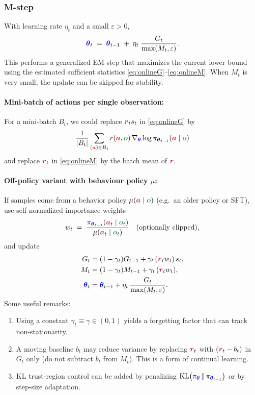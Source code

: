 \documentclass{article}
\newcommand{\colsym}[2]{\ensuremath{\textcolor{#1}{\boldsymbol{#2}}}}
\newcommand{\action}{\colsym{red}{a}}
\newcommand{\obs}{\colsym{ForestGreen}{o}}
\newcommand{\reward}{\colsym{purple}{r}}
\newcommand{\params}{\colsym{blue}{\theta}}
\begin{document}
\subsubsection{M-step}
With learning rate $\eta_t$ and a small $\varepsilon>0$,
\[
\params_t \;=\; \params_{t-1} \;+\; \eta_t\;\frac{G_t}{\max(M_t,\varepsilon)}.
\]
This performs a generalized EM step that maximizes the current lower bound using the estimated sufficient statistics \eqref{eq:onlineG}--\eqref{eq:onlineM}. When $M_t$ is very small, the update can be skipped for stability.

\paragraph{Mini-batch of actions per single observation:}
For a mini-batch $B_t$, we could replace $\reward_t s_t$ in \eqref{eq:onlineG} by
\[
\frac{1}{|B_t|}\sum_{(\action)\in B_t} r(\action,\obs)\,\nabla_{\params}\log \pi_{\params_{t-1}}(\action\mid\obs)
\]
and replace $\reward_t$ in \eqref{eq:onlineM} by the batch mean of $\reward$.

\paragraph{Off-policy variant with behaviour policy $\mu$:}
If samples come from a behavior policy $\mu(\action\mid\obs)$ (e.g.\ an older policy or SFT), use self-normalized importance weights
\[
w_t \;=\; \frac{\pi_{\params_{t-1}}(\action_t\mid\obs_t)}{\mu(\action_t\mid\obs_t)} \quad \text{(optionally clipped)},
\]
and update
\begin{align*}
G_t &= (1-\gamma_t)G_{t-1} + \gamma_t\, (\reward_t w_t)\, s_t,\\
M_t &= (1-\gamma_t)M_{t-1} + \gamma_t\, (\reward_t w_t),\\
\params_t &= \params_{t-1} + \eta_t\, \frac{G_t}{\max(M_t,\varepsilon)}.
\end{align*}
Some useful remarks:
\begin{enumerate}
    \item Using a constant $\gamma_t\equiv\gamma\in(0,1)$ yields a forgetting factor that can track non-stationarity.
    \item A moving baseline $b_t$ may reduce variance by replacing $\reward_t$ with $(\reward_t-b_t)$ in $G_t$ only (do not subtract $b_t$ from $M_t$). This is a form of continual learning.
    \item KL trust-region control can be added by penalizing $\mathrm{KL}\!\left(\pi_{\params}\,\|\,\pi_{\params_{t-1}}\right)$ or by step-size adaptation.
\end{enumerate}
\end{document}
